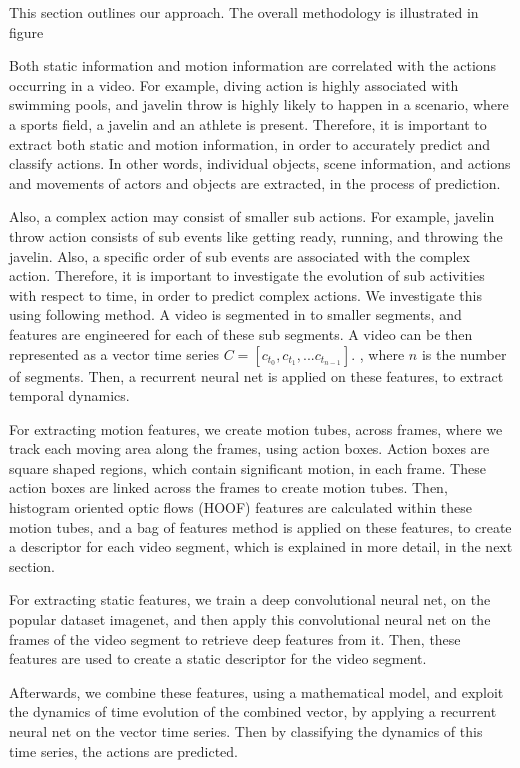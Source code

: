 

This section outlines our approach. The overall methodology is illustrated in figure

Both static information and motion information are correlated with the actions occurring in a video. For example, diving action
is highly associated with swimming pools, and javelin throw is highly likely to happen in a scenario, where a sports field, a javelin and an athlete is
present. Therefore, it is important to extract both static and motion information, in order to accurately predict and classify actions. In other words,
individual objects, scene information, and actions and movements of actors and objects are extracted, in the process of prediction. 


Also, a complex action may consist of smaller sub actions. For example, javelin throw action consists of sub events like getting ready,
running, and throwing the javelin. Also, a specific order of sub events are associated with the complex action. 
Therefore, it is important to investigate the evolution of sub activities with respect to time, in order to predict
complex actions. We investigate this using following method. A video is segmented in to smaller segments, and features are engineered for each of these sub segments. A video can be then represented as a vector time series $C = [c_{t_0}, c_{t_1}, ...c_{t_{n-1}}]$.
, where $n$ is the number of segments. Then, a recurrent neural net is applied on these features, to extract temporal dynamics.

For extracting motion features, we create motion tubes, across frames, where we track each moving area along the frames, using action boxes.
Action boxes are square shaped regions, which contain significant motion, in each frame. These action boxes are linked across the frames to create motion tubes. Then, histogram oriented optic flows (HOOF) features are calculated within these motion tubes, and a bag of features
method is applied on these features, to create a descriptor for each video segment, which is explained in more detail, in the next section. 

For extracting static features, we train a deep convolutional neural net, on the popular dataset imagenet, and then apply this convolutional neural net on the frames of the video segment to retrieve deep features from it. Then, these features are used
to create a static descriptor for the video segment.

Afterwards, we combine these features, using a mathematical model, and exploit the dynamics of time evolution of the combined vector, by applying a recurrent neural net on the vector time series. Then by classifying the dynamics of this time series, the actions are predicted.